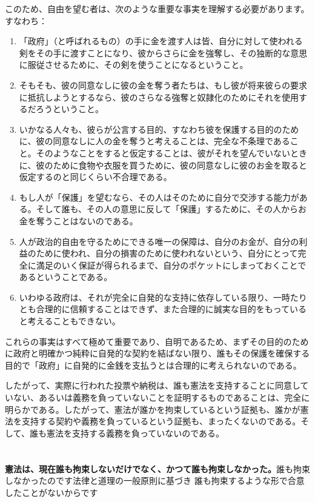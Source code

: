\documentclass[dvipdfmx, uplatex, tate, landscape]{utbook}
\begin{document}
 このため、自由を望む者は、次のような重要な事実を理解する必要があります。すなわち：
\begin{enumerate}
\item
「政府」（と呼ばれるもの）の手に金を渡す人は皆、自分に対して使われる剣をその手に渡すことになり、彼からさらに金を強奪し、その独断的な意思に服従させるために、その剣を使うことになるということ。
    \item そもそも、彼の同意なしに彼の金を奪う者たちは、もし彼が将来彼らの要求に抵抗しようとするなら、彼のさらなる強奪と奴隷化のためにそれを使用するだろうということ。
    \item いかなる人々も、彼らが公言する目的、すなわち彼を保護する目的のために、彼の同意なしに人の金を奪うと考えることは、完全な不条理であること。そのようなことをすると仮定することは、彼がそれを望んでいないときに、彼のために食物や衣服を買うために、彼の同意なしに彼のお金を取ると仮定するのと同じくらい不合理である。
    \item もし人が「保護」を望むなら、その人はそのために自分で交渉する能力がある。そして誰も、その人の意思に反して「保護」するために、その人からお金を奪うことはないのである。
    \item 人が政治的自由を守るためにできる唯一の保障は、自分のお金が、自分の利益のために使われ、自分の損害のために使われないという、自分にとって完全に満足のいく保証が得られるまで、自分のポケットにしまっておくことであるということである。
    \item いわゆる政府は、それが完全に自発的な支持に依存している限り、一時たりとも合理的に信頼することはできず、また合理的に誠実な目的をもっていると考えることもできない。
\end{enumerate}

これらの事実はすべて極めて重要であり、自明であるため、まずその目的のために政府と明確かつ純粋に自発的な契約を結ばない限り、誰もその保護を確保する目的で「政府」に自発的に金銭を支払うとは合理的に考えられないのである。

したがって、実際に行われた投票や納税は、誰も憲法を支持することに同意していない、あるいは義務を負っていないことを証明するものであることは、完全に明らかである。したがって、憲法が誰かを拘束しているという証拠も、誰かが憲法を支持する契約や義務を負っているという証拠も、まったくないのである。そして、誰も憲法を支持する義務を負っていないのである。

\chapter{}

{\bfseries{憲法は、現在誰も拘束しないだけでなく、かつて誰も拘束しなかった。}}誰も拘束しなかったのです法律と道理の一般原則に基づき 誰も拘束するような形で合意したことがないからです
\end{document}
